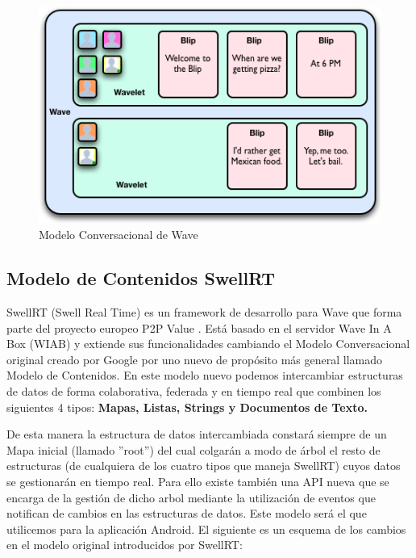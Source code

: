    \begin{figure}[H]
	  \centering
	    \includegraphics[keepaspectratio, scale=0.7]{Media/Captures/waveEntities.png}
	  \caption{Modelo Conversacional de Wave}
	  \label{fig:wave_model}
	\end{figure}
	
	\subsection{Modelo de Contenidos SwellRT}\label{ssec:swellRTModel}
	
	SwellRT \cite{ref:swellRT_github} (Swell Real Time) es un framework de desarrollo para Wave que forma parte del proyecto europeo P2P Value \cite{ref:p2pvalue}. Está basado en el servidor Wave In A Box \cite{ref:wave_in_a_box} (WIAB) y extiende sus funcionalidades cambiando el Modelo Conversacional original creado por Google por uno nuevo de propósito más general llamado Modelo de Contenidos. En este modelo nuevo podemos intercambiar estructuras de datos de forma colaborativa, federada y en tiempo real que combinen los siguientes 4 tipos: \textbf{Mapas, Listas, Strings y Documentos de Texto.}
	
	De esta manera la estructura de datos intercambiada constará siempre de un Mapa inicial (llamado ''root'') del cual colgarán a modo de árbol el resto de estructuras (de cualquiera de los cuatro tipos que maneja SwellRT) cuyos datos se gestionarán en tiempo real. Para ello existe también una API nueva que se encarga de la gestión de dicho arbol mediante la utilización de eventos que notifican de cambios en las estructuras de datos. Este modelo será el que utilicemos para la aplicación Android. El siguiente es un esquema de los cambios en el modelo original introducidos por SwellRT:
	
